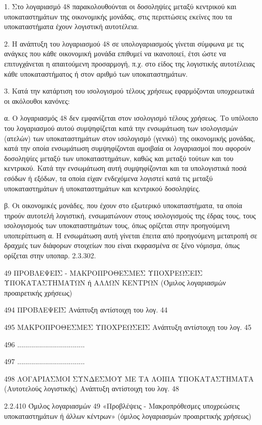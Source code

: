 \documentclass[A4,10pt,greek]{book}
\begin{document}
1. Στο λογαριασμό 48 παρακολουθούνται οι δοσοληψίες μεταξύ κεντρικού και υποκαταστημάτων της οικονομικής μονάδας, στις περιπτώσεις εκείνες που τα υποκαταστήματα έχουν λογιστική αυτοτέλεια.

2. Η ανάπτυξη του λογαριασμού 48 σε υπολογαριασμούς γίνεται σύμφωνα με τις ανάγκες που κάθε οικονομική μονάδα επιθυμεί να ικανοποιεί, έτσι ώστε να επιτυγχάνεται η απαιτούμενη προσαρμογή, π.χ. στο είδος της λογιστικής αυτοτέλειας κάθε υποκαταστήματος ή στον αριθμό των υποκαταστημάτων.

3. Κατά την κατάρτιση του ισολογισμού τέλους χρήσεως εφαρμόζονται υποχρεωτικά οι ακόλουθοι κανόνες:  

α. Ο λογαριασμός 48 δεν εμφανίζεται στον ισολογισμό τέλους χρήσεως. Το υπόλοιπο του λογαριασμού αυτού συμψηφίζεται κατά την ενσωμάτωση των ισολογισμών (ατελών) των υποκαταστημάτων στον ισολογισμό (γενικό) της οικονομικής μονάδας, κατά την οποία ενσωμάτωση συμψηφίζονται αμοιβαία οι λογαριασμοί που αφορούν δοσοληψίες μεταξύ των υποκαταστημάτων, καθώς και μεταξύ τούτων και του κεντρικού. Κατά την ενσωμάτωση αυτή συμψηφίζονται και τα υπολογιστικά ποσά εσόδων ή εξόδων, τα οποία είχαν ενδεχόμενα λογιστεί κατά τις μεταξύ υποκαταστημάτων ή υποκαταστημάτων και κεντρικού δοσοληψίες.

β. Οι οικονομικές μονάδες, που έχουν στο εξωτερικό υποκαταστήματα, τα οποία τηρούν αυτοτελή λογιστική, ενσωματώνουν στους ισολογισμούς της έδρας τους, τους ισολογισμούς των υποκαταστημάτων τους, όπως ορίζεται στην προηγούμενη υποπερίπτωση α. Η ενσωμάτωση αυτή γίνεται έπειτα από προηγούμενη μετατροπή σε δραχμές των διάφορων στοιχείων που είναι εκφρασμένα σε ξένο νόμισμα, όπως ορίζεται στην υποπαρ. 2.3.302.

 49   ΠΡΟΒΛΕΨΕΙΣ - ΜΑΚΡΟΠΡΟΘΕΣΜΕΣ ΥΠΟΧΡΕΩΣΕΙΣ
        ΥΠΟΚΑΤΑΣΤΗΜΑΤΩΝ ή ΑΛΛΩΝ ΚΕΝΤΡΩΝ
        (Όμιλος λογαριασμών προαιρετικής χρήσεως)

       494   ΠΡΟΒΛΕΨΕΙΣ
                Ανάπτυξη αντίστοιχη του λογ. 44

       495   ΜΑΚΡΟΠΡΟΘΕΣΜΕΣ ΥΠΟΧΡΕΩΣΕΙΣ
                Ανάπτυξη αντίστοιχη του λογ. 45

       496   ..................................

       497   ..................................

       498   ΛΟΓΑΡΙΑΣΜΟΙ ΣΥΝΔΕΣΜΟΥ ΜΕ ΤΑ ΛΟΙΠΑ
                ΥΠΟΚΑΤΑΣΤΗΜΑΤΑ
                (Αυτοτελούς λογιστικής)
                Ανάπτυξη αντίστοιχη του λογ. 48

2.2.410 Όμιλος λογαριασμών 49 «Προβλέψεις - Μακροπρόθεσμες υποχρεώσεις
υποκαταστημάτων ή άλλων κέντρων» (όμιλος λογαριασμών προαιρετικής χρήσεως)
\end{document}
